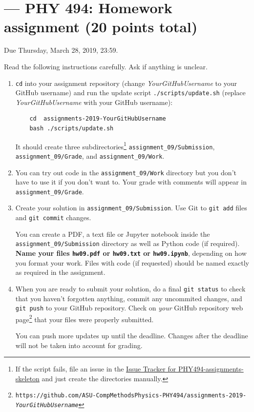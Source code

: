 \documentclass[letterpaper]{scrartcl}
\newcommand{\anumber}{9}
\newcommand{\anum}{0\anumber}
\begin{document}

\setcounter{section}{\anumber}
\addtocounter{section}{-1}
\section{ --- PHY 494: Homework assignment (20 points total)}

\noindent Due Thursday, March 28, 2019,
23:59.

\noindent
Read the following instructions carefully. Ask if anything is unclear.
\begin{enumerate}
\item \texttt{cd} into your assignment repository (change
  \emph{YourGitHubUsername} to your GitHub username) and run the
  update script \texttt{./scripts/update.sh} (replace
  \emph{YourGitHubUsername} with your GitHub username):
  \begin{verbatim}
    cd  assignments-2019-YourGitHubUsername
    bash ./scripts/update.sh
  \end{verbatim}
  It should create three subdirectories\footnote{If the script fails,
    file an issue in the
    \href{https://github.com/ASU-CompMethodsPhysics-PHY494/PHY494-assignments-skeleton/issues}{Issue
      Tracker for PHY494-assignments-skeleton} and just create the
    directories manually.} \texttt{assignment\_\anum/Submission},
  \texttt{assignment\_\anum/Grade}, and
  \texttt{assignment\_\anum/Work}.
\item You can try out code in the \texttt{assignment\_\anum/Work}
  directory but you don't have to use it if you don't want to. Your
  grade with comments will appear in
  \texttt{assignment\_\anum/Grade}.
\item Create your solution in
  \texttt{assignment\_\anum/Submission}. Use Git to \texttt{git
    add} files and \texttt{git commit} changes.

  You can create a PDF, a text file or Jupyter notebook inside the
  \texttt{assignment\_\anum/Submission} directory as well as Python
  code (if required). \textbf{Name your files \texttt{hw\anum.pdf} or
    \texttt{hw\anum.txt} or \texttt{hw\anum.ipynb}}, depending on how
  you format your work. Files with code (if requested) should be named
  exactly as required in the assignment.
\item When you are ready to submit your solution, do a final
  \texttt{git status} to check that you haven't forgotten anything,
  commit any uncommited changes, and \texttt{git push} to your GitHub
  repository. Check on \emph{your} GitHub repository web
  page\footnote{\texttt{https://github.com/ASU-CompMethodsPhysics-PHY494/assignments-2019-\emph{YourGitHubUsername}}}
  that your files were properly submitted.

  You can push more updates up until the deadline. Changes after the
  deadline will not be taken into account for grading.
\end{enumerate}
\end{document}
